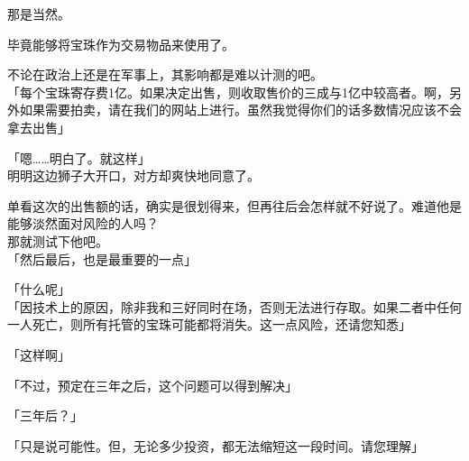 那是当然。

毕竟能够将宝珠作为交易物品来使用了。

不论在政治上还是在军事上，其影响都是难以计测的吧。\\

「每个宝珠寄存费1亿。如果决定出售，则收取售价的三成与1亿中较高者。啊，另外如果需要拍卖，请在我们的网站上进行。虽然我觉得你们的话多数情况应该不会拿去出售」

「嗯……明白了。就这样」\\

明明这边狮子大开口，对方却爽快地同意了。

单看这次的出售额的话，确实是很划得来，但再往后会怎样就不好说了。难道他是能够淡然面对风险的人吗？\\

那就测试下他吧。\\

「然后最后，也是最重要的一点」

「什么呢」\\

「因技术上的原因，除非我和三好同时在场，否则无法进行存取。如果二者中任何一人死亡，则所有托管的宝珠可能都将消失。这一点风险，还请您知悉」

「这样啊」

「不过，预定在三年之后，这个问题可以得到解决」

「三年后？」

「只是说可能性。但，无论多少投资，都无法缩短这一段时间。请您理解」

